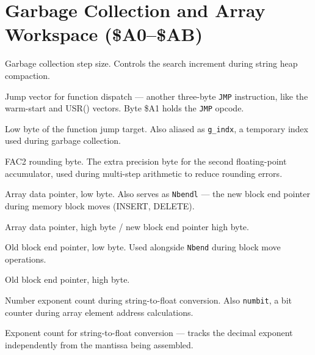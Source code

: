 \section{Garbage Collection and Array Workspace (\$A0--\$AB)}


Garbage collection step size.  Controls the search increment during string
heap compaction.


Jump vector for function dispatch --- another three-byte \texttt{JMP}
instruction, like the warm-start and USR() vectors.  Byte \$A1 holds the
\texttt{JMP} opcode.


Low byte of the function jump target.  Also aliased as \texttt{g\_indx}, a
temporary index used during garbage collection.


FAC2 rounding byte.  The extra precision byte for the second floating-point
accumulator, used during multi-step arithmetic to reduce rounding errors.


Array data pointer, low byte.  Also serves as \texttt{Nbendl} --- the new
block end pointer during memory block moves (INSERT, DELETE).


Array data pointer, high byte / new block end pointer high byte.


Old block end pointer, low byte.  Used alongside \texttt{Nbend} during block
move operations.


Old block end pointer, high byte.


Number exponent count during string-to-float conversion.  Also \texttt{numbit},
a bit counter during array element address calculations.


Exponent count for string-to-float conversion --- tracks the decimal exponent
independently from the mantissa being assembled.

